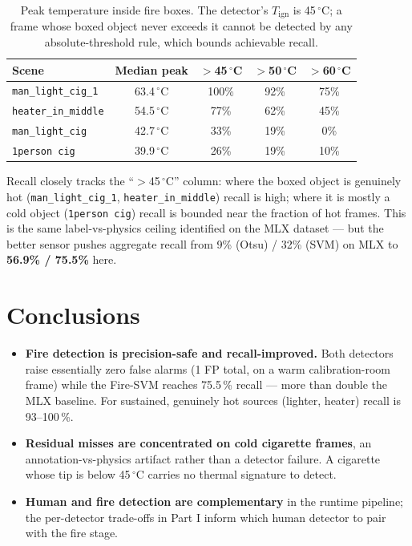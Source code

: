 \documentclass[11pt, a4paper]{article}
\begin{document}
\begin{table}[H]
\centering
\caption{Peak temperature inside fire boxes. The detector's $T_{\text{ign}}$ is
45\,$^\circ$C; a frame whose boxed object never exceeds it cannot be detected by
any absolute-threshold rule, which bounds achievable recall.}
\renewcommand{\arraystretch}{1.3}
\begin{tabular}{lcccc}
\toprule
\textbf{Scene} & \textbf{Median peak} & \textbf{$>$45\,$^\circ$C} & \textbf{$>$50\,$^\circ$C} & \textbf{$>$60\,$^\circ$C} \\
\midrule
\texttt{man\_light\_cig\_1} & 63.4\,$^\circ$C & 100\% & 92\% & 75\% \\
\texttt{heater\_in\_middle} & 54.5\,$^\circ$C & 77\%  & 62\% & 45\% \\
\texttt{man\_light\_cig}    & 42.7\,$^\circ$C & 33\%  & 19\% & 0\%  \\
\texttt{1person cig}        & 39.9\,$^\circ$C & 26\%  & 19\% & 10\% \\
\bottomrule
\end{tabular}
\end{table}

Recall closely tracks the ``$>$45\,$^\circ$C'' column: where the boxed object is
genuinely hot (\texttt{man\_light\_cig\_1}, \texttt{heater\_in\_middle}) recall is
high; where it is mostly a cold object (\texttt{1person cig}) recall is bounded
near the fraction of hot frames. This is the same label-vs-physics ceiling
identified on the MLX dataset --- but the better sensor pushes aggregate recall
from 9\% (Otsu) / 32\% (SVM) on MLX to \textbf{56.9\% / 75.5\%} here.

\section{Conclusions}

\begin{itemize}[leftmargin=2em]
    \item \textbf{Fire detection is precision-safe and recall-improved.} Both
        detectors raise essentially zero false alarms (1 FP total, on a warm
        calibration-room frame) while the Fire-SVM reaches 75.5\,\% recall ---
        more than double the MLX baseline. For sustained, genuinely hot sources
        (lighter, heater) recall is 93--100\,\%.
    \item \textbf{Residual misses are concentrated on cold cigarette frames},
        an annotation-vs-physics artifact rather than a detector failure. A
        cigarette whose tip is below 45\,$^\circ$C carries no thermal signature
        to detect.
    \item \textbf{Human and fire detection are complementary} in the runtime
        pipeline; the per-detector trade-offs in Part I inform which human
        detector to pair with the fire stage.
\end{itemize}
\end{document}
